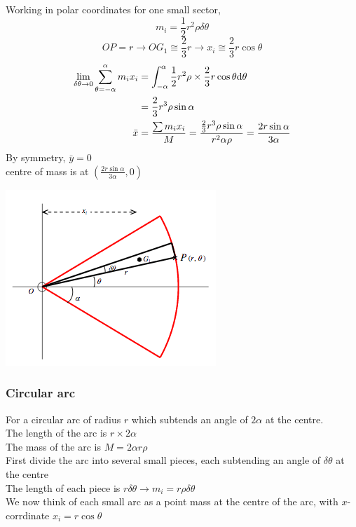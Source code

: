 \documentclass[a4paper]{article}
\begin{document}
Working in polar coordinates for one small sector,
\[
    m_i=\frac{1}{2}r^2\rho\delta\theta
\]
\[
    OP=r\rightarrow OG_1 \cong \frac{2}{3}r \rightarrow x_i \cong \frac{2}{3}r\cos\theta 
\]
\begin{align*}
    \lim_{\delta\theta\rightarrow 0}\sum_{\theta=-\alpha}^{\alpha}m_ix_i&=\int_{-\alpha}^{\alpha}\frac{1}{2}r^2\rho\times \frac{2}{3}r\cos\theta\mathrm{d}\theta\\ 
    &=\frac{2}{3}r^3\rho\sin\alpha\\
    \bar{x}&=\frac{\sum m_ix_i}{M}=\frac{\frac{2}{3}r^3\rho\sin\alpha}{r^2\alpha\rho}=\frac{2r\sin\alpha}{3\alpha}
\end{align*}
By symmetry, $\bar{y}=0$\\
centre of mass is at $(\frac{2r\sin\alpha}{3\alpha},0)$
\begin{center}
    \includegraphics[scale=0.5]{img_M/14_intro1}
\end{center}
\subsubsection{Circular arc}
For a circular arc of radius $r$ which subtends an angle of $2\alpha$ at the centre. \\

The length of the arc is $r\times 2\alpha$ \\
The mass of the arc is $M=2\alpha r \rho$ \\

First divide the arc into several small pieces, each subtending an angle of $\delta\theta$ at the centre \\

The length of each piece is $r\delta\theta\rightarrow m_i=r\rho\delta\theta$\\

We now think of each small arc as a point mass at the centre of the arc, with $x$-corrdinate $x_i=r\cos\theta$\\
\end{document}
